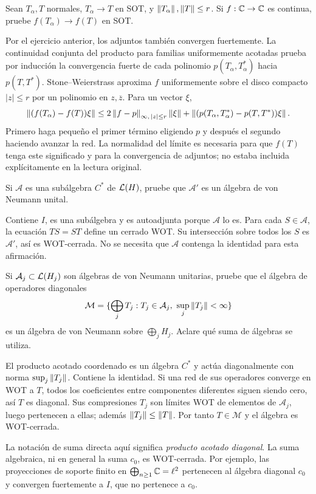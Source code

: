 \begin{ejercicio}\label{ej:v3-l31-7}
Sean $T_\alpha,T$ normales, $T_\alpha\to T$ en SOT, y $\left\lVert T_\alpha\right\rVert,\left\lVert T\right\rVert\le r$. Si $f:\mathbb C\to\mathbb C$ es continua, pruebe $f(T_\alpha)\to f(T)$ en SOT.
\end{ejercicio}
\begin{solucion}
Por el ejercicio anterior, los adjuntos también convergen fuertemente. La continuidad conjunta del producto para familias uniformemente acotadas prueba por inducción la convergencia fuerte de cada polinomio $p(T_\alpha,T_\alpha^*)$ hacia $p(T,T^*)$. Stone--Weierstrass aproxima $f$ uniformemente sobre el disco compacto $|z|\le r$ por un polinomio en $z,\overline z$. Para un vector $\xi$,
\[
 \left\lVert(f(T_\alpha)-f(T))\xi\right\rVert
 \le2\left\lVert f-p\right\rVert_{\infty,\,|z|\le r}\left\lVert\xi\right\rVert
 +\left\lVert(p(T_\alpha,T_\alpha^*)-p(T,T^*))\xi\right\rVert.
\]
Primero haga pequeño el primer término eligiendo $p$ y después el segundo haciendo avanzar la red. La normalidad del límite es necesaria para que $f(T)$ tenga este significado y para la convergencia de adjuntos; no estaba incluida explícitamente en la lectura original.
\end{solucion}

\begin{ejercicio}\label{ej:v3-l32-1}
Si $\mathcal A$ es una subálgebra $C^*$ de $\mathcal L(H)$, pruebe que $\mathcal A'$ es un álgebra de von Neumann unital.
\end{ejercicio}
\begin{solucion}
Contiene $I$, es una subálgebra y es autoadjunta porque $\mathcal A$ lo es. Para cada $S\in\mathcal A$, la ecuación $TS=ST$ define un cerrado WOT. Su intersección sobre todos los $S$ es $\mathcal A'$, así es WOT-cerrada. No se necesita que $\mathcal A$ contenga la identidad para esta afirmación.
\end{solucion}

\begin{ejercicio}\label{ej:v3-l32-2}
Si $\mathcal A_j\subset\mathcal L(H_j)$ son álgebras de von Neumann unitarias, pruebe que el álgebra de operadores diagonales
\[
 \mathcal M=\{\bigoplus_jT_j:T_j\in\mathcal A_j,\ \sup_j\left\lVert T_j\right\rVert<\infty\}
\]
es un álgebra de von Neumann sobre $\bigoplus_jH_j$. Aclare qué suma de álgebras se utiliza.
\end{ejercicio}
\begin{solucion}
El producto acotado coordenado es un álgebra $C^*$ y actúa diagonalmente con norma $\sup_j\left\lVert T_j\right\rVert$. Contiene la identidad. Si una red de sus operadores converge en WOT a $T$, todos los coeficientes entre componentes diferentes siguen siendo cero, así $T$ es diagonal. Sus compresiones $T_j$ son límites WOT de elementos de $\mathcal A_j$, luego pertenecen a ellas; además $\left\lVert T_j\right\rVert\le\left\lVert T\right\rVert$. Por tanto $T\in\mathcal M$ y el álgebra es WOT-cerrada.

La notación de suma directa aquí significa \emph{producto acotado diagonal}. La suma algebraica, ni en general la suma $c_0$, es WOT-cerrada. Por ejemplo, las proyecciones de soporte finito en $\bigoplus_{n\ge1}\mathbb C=\ell^2$ pertenecen al álgebra diagonal $c_0$ y convergen fuertemente a $I$, que no pertenece a $c_0$.
\end{solucion}

